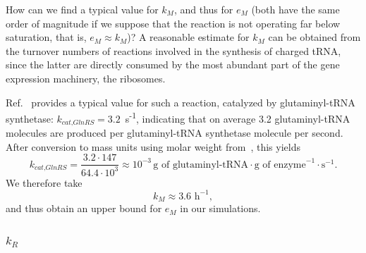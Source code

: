 How can we find a typical value for $k_M$, and thus for $e_M$ (both have the same order of magnitude if we suppose that the reaction is not operating far below saturation, that is, $e_M \approx k_M$)?
A reasonable estimate for $k_M$ can be obtained from the turnover numbers of reactions involved in the synthesis of charged tRNA, since the latter are directly consumed by the most abundant part of the gene expression machinery, the ribosomes.

Ref.~\cite{uter_longrange_2004} provides a typical value for such a reaction, catalyzed by glu\-ta\-min\-yl-tRNA synthetase: $k_{\textit{cat,GlnRS}} = 3.2$~s\textsuperscript{-1}, indicating that on average 3.2 glutaminyl-tRNA molecules are produced per glutaminyl-tRNA synthetase molecule per second. 
After conversion to mass units using molar weight from~\cite{freist_glutaminyltrna_1997}, this yields
\[
k_{\textit{cat,GlnRS}} = \frac{3.2 \cdot 147}{64.4 \cdot 10^ 3} \approx 10^{-3} \, \text{g of glutaminyl-tRNA} \cdot \text{g of enzyme}^{-1} \cdot \text{s}^{-1}.
\]
We therefore take
\[
k_M \approx 3.6 \text{ h}^{-1},
\]
and thus obtain an upper bound for $e_M$ in our simulations.

\subsubsection{\Large \texorpdfstring{$k_R$}{kR}}

